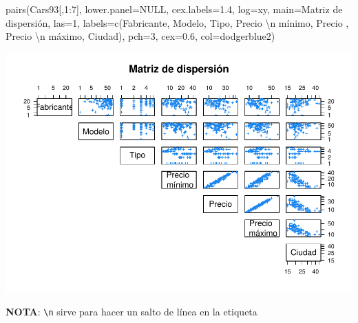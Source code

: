\documentclass[
]{book}
\newenvironment{Shaded}{\begin{snugshade}}{\end{snugshade}}
\newcommand{\AttributeTok}[1]{\textcolor[rgb]{0.77,0.63,0.00}{#1}}
\newcommand{\ConstantTok}[1]{\textcolor[rgb]{0.00,0.00,0.00}{#1}}
\newcommand{\DecValTok}[1]{\textcolor[rgb]{0.00,0.00,0.81}{#1}}
\newcommand{\FloatTok}[1]{\textcolor[rgb]{0.00,0.00,0.81}{#1}}
\newcommand{\FunctionTok}[1]{\textcolor[rgb]{0.00,0.00,0.00}{#1}}
\newcommand{\NormalTok}[1]{#1}
\newcommand{\SpecialCharTok}[1]{\textcolor[rgb]{0.00,0.00,0.00}{#1}}
\newcommand{\StringTok}[1]{\textcolor[rgb]{0.31,0.60,0.02}{#1}}
\begin{document}
\begin{Shaded}
\begin{Highlighting}[]
\FunctionTok{pairs}\NormalTok{(Cars93[,}\DecValTok{1}\SpecialCharTok{:}\DecValTok{7}\NormalTok{], }\AttributeTok{lower.panel=}\ConstantTok{NULL}\NormalTok{, }\AttributeTok{cex.labels=}\FloatTok{1.4}\NormalTok{, }\AttributeTok{log=}\StringTok{\textquotesingle{}xy\textquotesingle{}}\NormalTok{,}
      \AttributeTok{main=}\StringTok{\textquotesingle{}Matriz de dispersión\textquotesingle{}}\NormalTok{, }\AttributeTok{las=}\DecValTok{1}\NormalTok{,}
      \AttributeTok{labels=}\FunctionTok{c}\NormalTok{(}\StringTok{\textquotesingle{}Fabricante\textquotesingle{}}\NormalTok{, }\StringTok{\textquotesingle{}Modelo\textquotesingle{}}\NormalTok{, }\StringTok{\textquotesingle{}Tipo\textquotesingle{}}\NormalTok{, }\StringTok{\textquotesingle{}Precio }\SpecialCharTok{\textbackslash{}n}\StringTok{ mínimo\textquotesingle{}}\NormalTok{, }\StringTok{\textquotesingle{}Precio\textquotesingle{}}\NormalTok{ , }\StringTok{\textquotesingle{}Precio }\SpecialCharTok{\textbackslash{}n}\StringTok{ máximo\textquotesingle{}}\NormalTok{, }\StringTok{\textquotesingle{}Ciudad\textquotesingle{}}\NormalTok{),}
      \AttributeTok{pch=}\DecValTok{3}\NormalTok{, }\AttributeTok{cex=}\FloatTok{0.6}\NormalTok{, }\AttributeTok{col=}\StringTok{\textquotesingle{}dodgerblue2\textquotesingle{}}\NormalTok{)}
\end{Highlighting}
\end{Shaded}

\includegraphics{fig/unnamed-chunk-98-1.pdf}

\textbf{NOTA}: \texttt{\textbackslash{}n} sirve para hacer un salto de línea en la etiqueta
\end{document}
